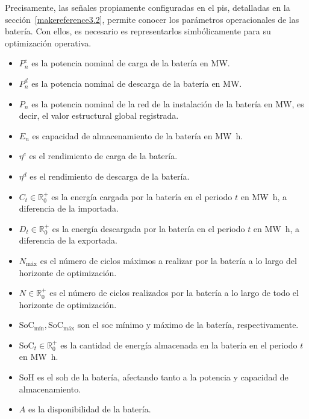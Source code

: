 Precisamente, las señales propiamente configuradas en el \gls{pis}, detalladas en la sección~\ref{makereference3.2}, permite conocer los parámetros operacionales de las batería. Con ellos, es necesario es representarlos simbólicamente para su optimización operativa.

\begin{itemize}

  \item \( P^{c}_{n} \) es la potencia nominal de carga de la batería en \si{\mega\watt}.

  \item \( P^{d}_{n} \) es la potencia nominal de descarga de la batería en \si{\mega\watt}.

  \item \( P_{n} \) es la potencia nominal de la red de la instalación de la batería en \si{\mega\watt}, es decir, el valor estructural global registrada.

  \item \( E_{n} \) es capacidad de almacenamiento de la batería en \si{{\mega\watt\hour}}.

  \item \( \eta^{c} \) es el rendimiento de carga de la batería.

  \item \( \eta^{d} \) es el rendimiento de descarga de la batería.

  \item \( C_{t} \in \mathbb{R}^{+}_{0} \) es la energía cargada por la batería en el periodo \( t \) en \si{{\mega\watt\hour}}, a diferencia de la importada.

  \item \( D_{t} \in \mathbb{R}^{+}_{0} \) es la energía descargada por la batería en el periodo \( t \) en \si{{\mega\watt\hour}}, a diferencia de la exportada.

  \item \( N_{\text{máx}} \) es el número de ciclos máximos a realizar por la batería a lo largo del horizonte de optimización.

  \item \( N \in \mathbb{R}^{+}_{0} \) es el número de ciclos realizados por la batería a lo largo de todo el horizonte de optimización.

  \item \( \text{SoC}_{\text{mín}}, \text{SoC}_{\text{máx}} \) son el \gls{soc} mínimo y máximo de la batería, respectivamente.

  \item \( \text{SoC}_{t} \in \mathbb{R}^{+}_{0} \) es la cantidad de energía almacenada en la batería en el periodo \( t \) en \si{{\mega\watt\hour}}.

  \item \( \text{SoH} \) es el \gls{soh} de la batería, afectando tanto a la potencia y capacidad de almacenamiento.

  \item \( A \) es la disponibilidad de la batería.

\end{itemize}

